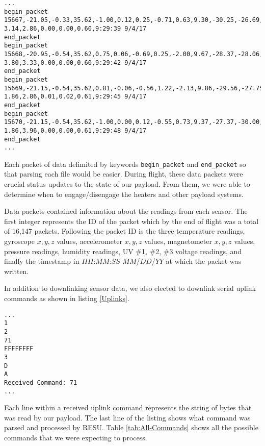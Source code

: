 \lstset{basicstyle=\small, numbers=left, xleftmargin=2em, frame=tb, label = Downlinks, framexleftmargin=1.5em}
\begin{lstlisting}[caption = Sample of downlinked data packets ID: 15667 - 15670.]
...
begin_packet
15667,-21.05,-0.33,35.62,-1.00,0.12,0.25,-0.71,0.63,9.30,-30.25,-26.69,-60.88
3.14,2.86,0.00,0.00,0.60,9:29:39 9/4/17
end_packet
begin_packet
15668,-20.95,-0.54,35.62,0.75,0.06,-0.69,0.25,-2.00,9.67,-28.37,-28.06,-60.06
3.80,3.33,0.00,0.00,0.60,9:29:42 9/4/17
end_packet
begin_packet
15669,-21.15,-0.54,35.62,0.81,-0.06,-0.56,1.22,-2.13,9.86,-29.56,-27.75,-57.88
1.86,2.86,0.01,0.02,0.61,9:29:45 9/4/17
end_packet
begin_packet
15670,-21.15,-0.54,35.62,-1.00,0.00,0.12,-0.55,0.73,9.37,-27.37,-30.00,-58.75
1.86,3.96,0.00,0.00,0.61,9:29:48 9/4/17
end_packet
...
\end{lstlisting}
\medskip

Each packet of data delimited by keywords \verb|begin_packet| and \verb|end_packet| so that parsing each file would be easier.  During flight, these data packets were crucial status updates to the state of our payload.  From them, we were able to determine when to engage/disengage the heaters and other payload systems.

Data packets contained information about the readings from each sensor.  The first integer represents the ID of the packet which by the end of flight was a total of 16,147 packets.  Following the packet ID is the three temperature readings, gyroscope $x, y, z$ values, accelerometer $x, y, z$ values, magnetometer $x, y, z$ values, pressure readings, humidity readings, UV \#1, \#2, \#3 voltage readings, and finally the timestamp in $HH$:$MM$:$SS$ $MM$/$DD$/$YY$ at which the packet was written.  

In addition to downlinking sensor data, we also elected to downlink serial uplink commands as shown in listing \ref{Uplinks}.  

\lstset{basicstyle=\small, numbers=left, frame=tb, linewidth=11.5cm, xleftmargin=.4\textwidth, label = Uplinks}
\begin{lstlisting}[caption = Sample of received uplink commands in downlinked packets]
...
1
2
71
FFFFFFFF
3
D
A
Received Command: 71
...
\end{lstlisting}
\medskip

Each line within a received uplink command represents the string of bytes that was read by our payload.  The last line of the listing shows what command was parsed and processed by RESU.  Table \ref{tab:All-Commands} shows all the possible commands that we were expecting to process. 
